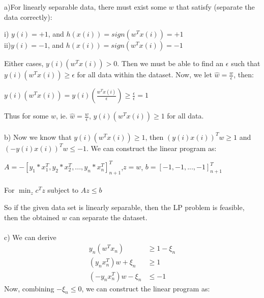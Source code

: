 \documentclass[12pt]{article}
\begin{document}
 \\\\
a)For linearly separable data, there must exist some $w$ that satisfy (separate the data correctly): \begin{center}
i) $y(i) = +1$, and $h(x(i)) = sign(w^Tx(i)) = +1$\\
ii)$y(i) = -1$, and $h(x(i)) = sign(w^Tx(i)) = -1$\end{center}
Either cases, $y(i)(w^Tx(i)) > 0$. Then we must be able to find an $\epsilon$ such that $y(i)(w^Tx(i)) \geq \epsilon$ for all data within the dataset. Now, we let $\displaystyle \hat{w} = \frac{w}{\epsilon}$, then:
\begin{center}
$\displaystyle y(i)(w^Tx(i)) = y(i)(\frac{w^Tx(i)}{\epsilon}) \geq \frac{\epsilon}{\epsilon} = 1$
\end{center}
Thus for some $w$, ie. $\displaystyle \hat{w} = \frac{w}{\epsilon}$, $y(i)(w^Tx(i)) \geq 1$ for all data.\\\\
b) Now we know that $y(i)(w^Tx(i)) \geq 1$, then $(y(i)x(i))^Tw \geq 1$ and $(-y(i)x(i))^Tw \leq -1$. We can construct the linear program as: 
\begin{center}
$\displaystyle A = -\left[y_1*x_1^T,y_2*x_2^T,...,y_n*x_n^T\right]_{n+1}^T$,$z = w$, $b = [-1,-1,...,-1]_{n+1}^T$\\\indent\\
For $\displaystyle \min_{z} c^Tz$ subject to $Az \leq b$
\end{center}
So if the given data set is linearly separable, then the LP problem is feasible, then the obtained $w$ can separate the dataset.\\\\
c) We can derive
\begin{align*}
y_n(w^Tx_n) & \geq 1 - \xi_n \\
(y_nx_n^T)w + \xi_n & \geq 1\\ 
(-y_nx_n^T)w - \xi_n & \leq -1
\end{align*}
Now, combining $-\xi_n \leq 0$, we can construct the linear program as:
\end{document}
